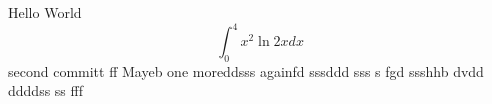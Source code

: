 \documentclass{article}
\begin{document}
Hello World
$$\int_0^4 x^2 \ln{2x}dx$$
second committ  ff
Mayeb
one moreddsss
againfd
sssddd sss
s fgd
ssshhb dvdd ddddss ss fff
\end{document}
